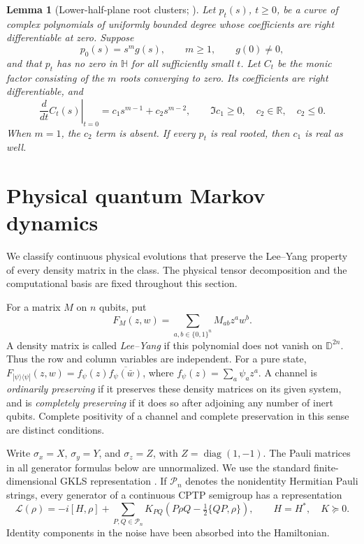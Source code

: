 \documentclass[reqno]{amsart}
\newtheorem{lemma}[theorem]{Lemma}
\theoremstyle{definition}
\theoremstyle{remark}
\newcommand{\R}{\mathbb R}
\newcommand{\D}{\mathbb D}
\newcommand{\HH}{\mathbb H}
\DeclareMathOperator{\diag}{diag}
\begin{document}
\begin{lemma}[Lower-half-plane root clusters; \cite{WeiGenerators2026}]
\label{gen:cluster-moments}
Let \(p_t(s)\), \(t\geq0\), be a curve of complex polynomials of uniformly
bounded degree whose coefficients are right differentiable at zero.
Suppose
\[
 p_0(s)=s^m g(s),\qquad m\geq1,\qquad g(0)\neq0,
\]
and that \(p_t\) has no zero in \(\HH\) for all sufficiently small \(t\).
Let \(C_t\) be the monic factor consisting of the \(m\) roots converging
to zero.  Its coefficients are right differentiable, and
\begin{equation}
 \left.\frac{d}{dt}C_t(s)\right|_{t=0}
 =c_1s^{m-1}+c_2s^{m-2},
 \qquad
 \Im c_1\geq0,\quad c_2\in\R,\quad c_2\leq0.
 \label{gen:eq-cluster-variation}
\end{equation}
When \(m=1\), the \(c_2\) term is absent.  If every \(p_t\) is real
rooted, then \(c_1\) is real as well.
\end{lemma}


\section{Physical quantum Markov dynamics}\label{dyn:section}

We classify continuous physical evolutions that preserve the Lee--Yang
property of every density matrix in the class.  The physical tensor
decomposition and the computational basis are fixed throughout this section.

For a matrix $M$ on $n$ qubits, put
\begin{equation}\label{dyn:polynomial}
 F_M(z,w)=\sum_{a,b\in\{0,1\}^n}M_{ab}z^a w^b.
\end{equation}
A density matrix is called \emph{Lee--Yang} if this polynomial does not vanish
on $\D^{2n}$.  Thus the row and column variables are independent.  For a pure
state, $F_{|\psi\rangle\langle\psi|}(z,w)
=f_\psi(z)\overline{f_\psi(\bar w)}$, where
$f_\psi(z)=\sum_a\psi_a z^a$.  A channel is \emph{ordinarily preserving} if it
preserves these density matrices on its given system, and is \emph{completely
preserving} if it does so after adjoining any number of inert qubits.  Complete
positivity of a channel and complete preservation in this sense are distinct
conditions.

Write $\sigma_x=X$, $\sigma_y=Y$, and $\sigma_z=Z$, with
$Z=\diag(1,-1)$.  The Pauli matrices in all generator formulas below are
unnormalized.  We use the standard finite-dimensional GKLS representation
\cite{GKS76,Lindblad76}.  If $\mathcal P_n$ denotes the nonidentity Hermitian
Pauli strings, every generator of a continuous CPTP semigroup has a
representation
\begin{equation}\label{dyn:gkls}
 \mathcal L(\rho)=-i[H,\rho]
 +\sum_{P,Q\in\mathcal P_n}K_{PQ}
 \left(P\rho Q-\tfrac12\{QP,\rho\}\right),
 \qquad H=H^*,\quad K\succeq0.
\end{equation}
Identity components in the noise have been absorbed into the Hamiltonian.
\end{document}
